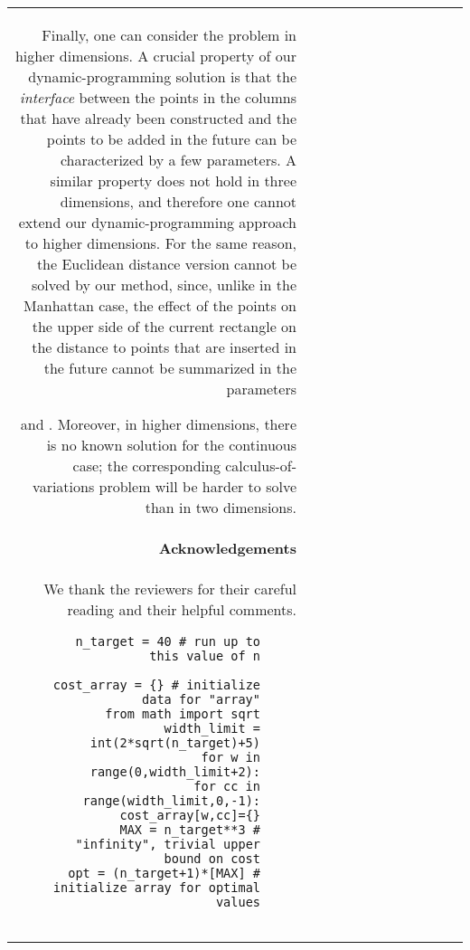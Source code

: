 \documentclass[preprint,authoryear,12pt]{elsarticle}
\begin{document}
\begin{table}
{\begin{tabular}{|r|rr|rr|r||r|rr|rr|r|}
{Finally, one can consider the problem
in higher dimensions.
A crucial property of our dynamic-programming solution
is that the \emph{interface} between the points in
the columns that have already been constructed and
the points to be added in the future can be characterized by
a few parameters.
A similar property does not hold in three dimensions,
and therefore one cannot extend our
 dynamic-programming approach to higher dimensions.
For the same reason, the Euclidean distance version
cannot be solved by our method, since, unlike in the Manhattan
case, the effect of the  points on the upper
side of the current rectangle on the distance to points that are
inserted in the future cannot be summarized in the parameters

and
.
Moreover, in higher dimensions, there is no known solution for the
continuous case; the corresponding calculus-of-variations problem
will be harder to solve than in two dimensions.

\paragraph{Acknowledgements}
We thank the reviewers for their careful reading and their helpful comments.





















\appendix

\begin{figure}
  \centering
{\small
\footnotesize
\begin{verbatim}
n_target = 40 # run up to this value of n
\end{verbatim}
\vspace{-1,6\baselineskip}
\begin{verbatim}
cost_array = {} # initialize data for "array"
from math import sqrt
width_limit = int(2*sqrt(n_target)+5)
for w in range(0,width_limit+2):
 for cc in range(width_limit,0,-1):
  cost_array[w,cc]={}
MAX = n_target**3 # "infinity", trivial upper bound on cost
opt = (n_target+1)*[MAX] # initialize array for optimal values


\end{verbatim}}
\end{figure}}
\end{tabular}}
\end{table}
\end{document}
